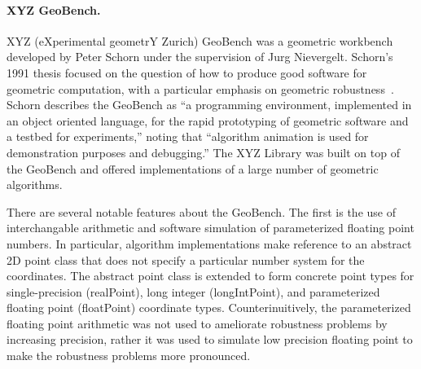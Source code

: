 \paragraph{XYZ GeoBench.}

XYZ (eXperimental geometrY Zurich) GeoBench was a geometric workbench developed
by Peter Schorn under the supervision of Jurg Nievergelt. Schorn's 1991 thesis
focused on the question of how to produce good software for geometric
computation, with a particular emphasis on geometric
robustness~\cite{schorn1991robust}. Schorn describes the
GeoBench as ``a programming environment, implemented in an object oriented
language, for the rapid prototyping of geometric software and a testbed for
experiments,'' noting that ``algorithm animation is used for demonstration
purposes and debugging.'' The XYZ Library was built on top of the GeoBench and
offered implementations of a large number of geometric algorithms. 

There are several notable features about the GeoBench. The first is the use of
interchangable arithmetic and software simulation of parameterized floating
point numbers. In particular, algorithm implementations make reference to an
abstract 2D point class that does not specify a particular number system for the
coordinates. The abstract point class is extended to form concrete point types
for single-precision (realPoint), long integer (longIntPoint), and parameterized
floating point (floatPoint) coordinate types. Counterinuitively, the
parameterized floating point arithmetic was not used to ameliorate robustness
problems by increasing precision, rather it was used to simulate low precision
floating point to make the robustness problems more pronounced.


